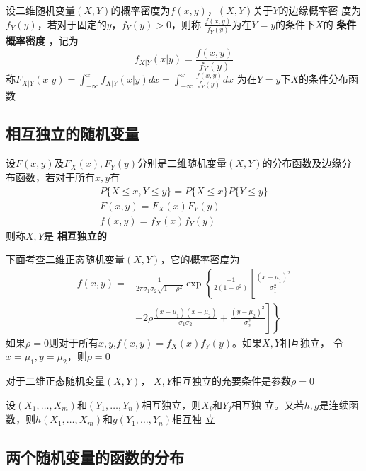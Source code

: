 \documentclass[11pt]{article}
\begin{document}
\begin{definition}[]
设二维随机变量\((X,Y)\)的概率密度为\(f(x,y)\)，\((X,Y)\)关于\(Y\)的边缘概率密
度为\(f_Y(y)\)，若对于固定的\(y\)，\(f_Y(y)>0\)，则称
\(\frac{f(x,y)}{f_Y(y)}\)为在\(Y=y\)的条件下\(X\)的 \textbf{条件概率密度} ，记为
\begin{equation*}
 f_{X|Y}(x|y)=\frac{f(x,y)}{f_Y(y)}
\end{equation*}
称\(F_{X|Y}(x|y)=\int_{-\infty}^xf_{X|Y}(x|y)dx=\int_{-\infty}^x\frac{f(x,y)}{f_Y(y)}dx\)
为在\(Y=y\)下\(X\)的条件分布函数
\end{definition}
\subsection{相互独立的随机变量}
\label{sec:org0f52590}
\begin{definition}[]
设\(F(x,y)\)及\(F_X(x),F_Y(y)\)分别是二维随机变量\((X,Y)\)的分布函数及边缘分
布函数，若对于所有\(x,y\)有
\begin{gather*}
P\{X\le x,Y\le y\}=P\{X\le x\}P\{Y\le y\}\\
F(x,y)=F_X(x)F_Y(y)\\
f(x,y)=f_X(x)f_Y(y)
\end{gather*}
则称\(X,Y\)是 \textbf{相互独立的}
\end{definition}

下面考查二维正态随机变量\((X,Y)\)，它的概率密度为
   \begin{align*}
f(x,y)=&
\frac{1}{2\pi\sigma_1\sigma_2\sqrt{1-\rho^2}}\exp\left\{
\frac{-1}{2(1-\rho^2)}\left[
\frac{(x-\mu_1)^2}{\sigma_1^2}\right.\right.\\
&\left.\left.
-2\rho\frac{(x-\mu_1)(x-\mu_2)}{\sigma_1\sigma_2}+
\frac{(y-\mu_2)^2}{\sigma_2^2}
\right]
\right\}
\end{align*}
如果\(\rho=0\)则对于所有\(x,y\),\(f(x,y)=f_X(x)f_Y(y)\)。如果\(X,Y\)相互独立，
令\(x=\mu_1,y=\mu_2\)，则\(\rho=0\)

对于二维正态随机变量\((X,Y)\)， \(X,Y\)相互独立的充要条件是参数\(\rho=0\)

\begin{theorem}[]
设\((X_1,\dots,X_m)\)和\((Y_1,\dots,Y_n)\)相互独立，则\(X_i\)和\(Y_j\)相互独
立。又若\(h,g\)是连续函数，则\(h(X_1,\dots,X_m)\)和\(g(Y_1,\dots,Y_n)\)相互独
立
\end{theorem}
\subsection{两个随机变量的函数的分布}
\label{sec:orge3f7ea8}
\end{document}
